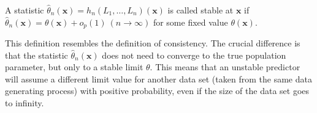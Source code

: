 \begin{definition} \label{stability}
A statistic $\hat{\theta}_{n}(\mathbf{x}) = h_{n}(L_{1},\dots, L_{n})(\mathbf{x})$ is called stable at $\mathbf{x}$ if $\hat{\theta}_{n}(\mathbf{x}) = \theta(\mathbf{x}) + o_{p}(1) \: (n \rightarrow \infty)$ for some fixed value $\theta(\mathbf{x})$.
\end{definition}

\noindent
This definition resembles the definition of consistency. The crucial difference is that the statistic $\hat{\theta}_n(\mathbf{x})$ does not need to converge to the true population parameter, but only to a stable limit $\theta$. This means that an unstable predictor will assume a different limit value for another data set (taken from the same data generating process) with positive probability, even if the size of the data set goes to infinity.
